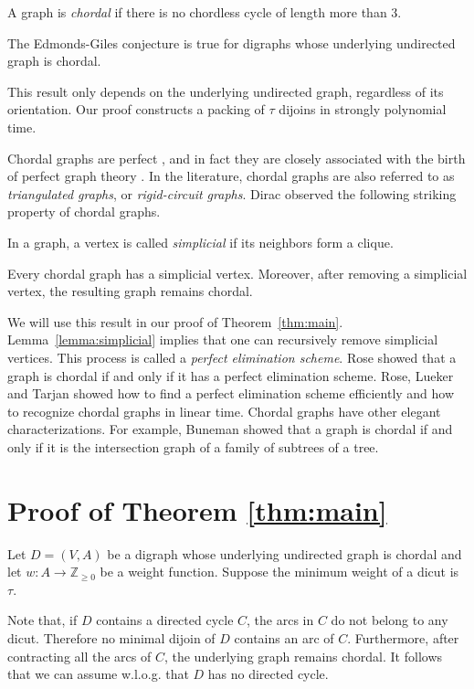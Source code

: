 \documentclass[runningheads]{llncs}
\newcommand{\Z}{\mathbb{Z}}
\begin{document}
A graph is \textit{chordal} if there is no chordless cycle of length more than $3$.

\begin{theorem}\label{thm:main}
    The Edmonds-Giles conjecture is true for digraphs whose underlying undirected graph is chordal.
\end{theorem}
This result only depends on the underlying undirected graph, regardless of its orientation. Our proof constructs a packing of $\tau$ dijoins in strongly polynomial time.

Chordal graphs are perfect \cite{hajnal58}, and in fact they are closely associated with the birth of perfect graph theory \cite{berge1960}. In the literature, chordal graphs are also referred to as {\em triangulated graphs}, or {\em rigid-circuit graphs}.  Dirac \cite{dirac1961rigid} observed the following striking property of chordal graphs.

 In a graph, a vertex is called  \emph{simplicial} if its neighbors form a clique.
 
\begin{lemma}\label{lemma:simplicial}
Every chordal graph has a simplicial vertex. Moreover,
after removing a simplicial vertex, the resulting graph remains chordal.
\end{lemma}
 We will use this result in our proof of Theorem~\ref{thm:main}. Lemma~\ref{lemma:simplicial} implies that one can recursively remove simplicial vertices. This process is called a \textit{perfect elimination scheme}. Rose \cite{rose1970triangulated} showed that a graph is chordal if and only if it has a perfect elimination scheme. Rose, Lueker and Tarjan \cite{roseluekertarjan1976} showed how to find a perfect elimination scheme efficiently and how to recognize chordal graphs in linear time. Chordal graphs have other elegant characterizations. For example, Buneman \cite{Buneman1974} showed that a graph is chordal if and only if it is the intersection graph of a family of subtrees of a tree.

\section{Proof of Theorem \ref{thm:main}}

Let $D=(V,A)$ be a digraph whose underlying undirected graph is chordal and let $w: A\rightarrow \Z_{\geq 0}$ be a weight function. Suppose the minimum weight of a dicut is $\tau$. 

    Note that, if $D$ contains a directed cycle $C$, the 
    arcs in $C$ do not belong to any dicut. Therefore no minimal dijoin of $D$ contains an arc of $C$. Furthermore, after contracting all the arcs of $C$, the underlying graph remains chordal. It follows that
    we can assume w.l.o.g. that $D$ has no directed cycle. 
\end{document}
